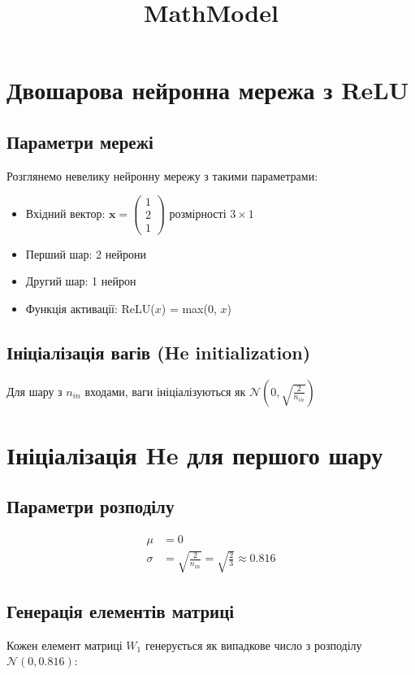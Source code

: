 \documentclass{article}
\title{MathModel}
\begin{document}
\maketitle

\section{Двошарова нейронна мережа з ReLU}

\subsection{Параметри мережі}
Розглянемо невелику нейронну мережу з такими параметрами:
\begin{itemize}
    \item Вхідний вектор: $\mathbf{x} = \begin{pmatrix} 1 \\ 2 \\ 1 \end{pmatrix}$ розмірності $3 \times 1$
    \item Перший шар: 2 нейрони
    \item Другий шар: 1 нейрон
    \item Функція активації: ReLU($x$) = max(0, $x$)
\end{itemize}

\subsection{Ініціалізація вагів (He initialization)}
Для шару з $n_{in}$ входами, ваги ініціалізуються як $\mathcal{N}(0, \sqrt{\frac{2}{n_{in}}})$


\section{Ініціалізація He для першого шару}

\subsection{Параметри розподілу}
\begin{align*}
\mu &= 0 \\
\sigma &= \sqrt{\frac{2}{n_{in}}} = \sqrt{\frac{2}{3}} \approx 0.816
\end{align*}

\subsection{Генерація елементів матриці}
Кожен елемент матриці $W_1$ генерується як випадкове число з розподілу $\mathcal{N}(0, 0.816)$:
\end{document}
